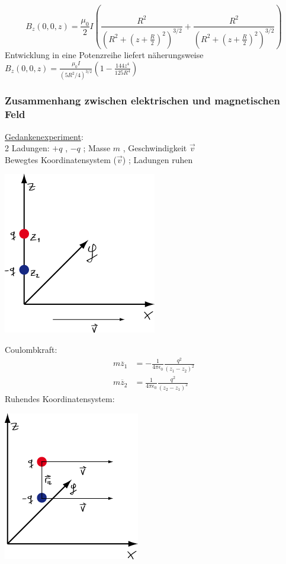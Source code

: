 $$ B_z (0,0,z) = \frac{\mu_0}{2}I\left( \frac{R^2}{(R^2+(z+\frac{R}{2})^2 )^{3/2} }+\frac{R^2}{(R^2+(z+\frac{R}{2})^2 )^{3/2} }\right)  $$
Entwicklung in eine Potenzreihe liefert näherungsweise $  B_z (0,0,z) = \frac{\mu_0 I}{(5R^2/4)^{3/2}}\left( 1-\frac{144z^4}{125R^4} \right)  $
\subsubsection{Zusammenhang zwischen elektrischen und magnetischen Feld}
\underline{Gedankenexperiment}: \\
2 Ladungen: \hspace{5mm} $ +q $ , $ -q $ ; Masse $ m $ , Geschwindigkeit $ \vec{v} $ \\
Bewegtes Koordinatensystem ($ \vec{v} $) ; Ladungen ruhen
\begin{center}
	\includegraphics[width=0.4\linewidth]{skizzen/16/16_2B14}
\end{center}
Coulombkraft:
\begin{align*}
	m\ddot{z_1} &= - \frac{1}{4\pi\epsilon_0} \frac{q^2}{(z_1-z_2)^2} \\
	m\ddot{z_2} &= \frac{1}{4\pi\epsilon_0} \frac{q^2}{(z_2-z_1)^2}
\end{align*}
Ruhendes Koordinatensystem:
\begin{center}
	\includegraphics[width=0.4\linewidth]{skizzen/16/16_2B15}
\end{center}
